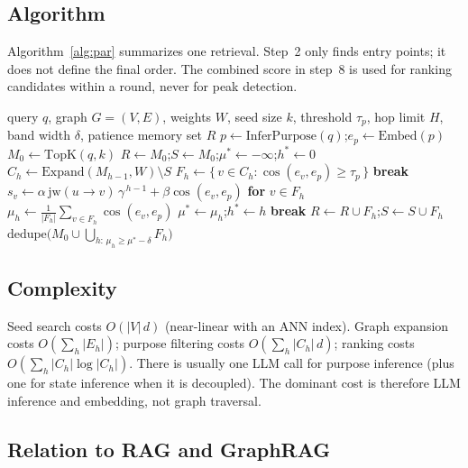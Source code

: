 \documentclass[11pt]{article}
\begin{document}
\subsection{Algorithm}

Algorithm~\ref{alg:par} summarizes one retrieval. Step~2 only finds entry points; it does not
define the final order. The combined score in step~8 is used for ranking candidates within a
round, never for peak detection.

\begin{algorithm}[t]
  \caption{PAR}\label{alg:par}
  \begin{algorithmic}[1]
    \Require query $q$, graph $G=(V,E)$, weights $W$, seed size $k$, threshold $\tau_p$,
             hop limit $H$, band width $\delta$, patience
    \Ensure memory set $R$
    \State $p\gets\mathrm{InferPurpose}(q)$;\quad $e_p\gets\mathrm{Embed}(p)$
    \State $M_0\gets\mathrm{TopK}(q,k)$ 
    \State $R\gets M_0$;\quad $S\gets M_0$;\quad $\mu^\ast\gets-\infty$;\quad $h^\ast\gets0$
      \State $C_h\gets\mathrm{Expand}(M_{h-1},W)\setminus S$
      \State $F_h\gets\{\,v\in C_h:\cos(e_v,e_p)\ge\tau_p\,\}$
       \State \textbf{break} \EndIf
      \State $s_v\gets\alpha\,\mathrm{jw}(u\!\to\!v)\,\gamma^{\,h-1}
             +\beta\cos(e_v,e_p)$ \textbf{for} $v\in F_h$
      \State $\mu_h\gets\frac{1}{|F_h|}\sum_{v\in F_h}\cos(e_v,e_p)$
       \State $\mu^\ast\gets\mu_h$;\quad $h^\ast\gets h$ \EndIf
       \State \textbf{break} \EndIf
      \State $R\gets R\cup F_h$;\quad $S\gets S\cup F_h$
    \EndFor
    \State \Return $\mathrm{dedupe}\bigl(M_0\cup\bigcup_{h:\,\mu_h\ge\mu^\ast-\delta}F_h\bigr)$
  \end{algorithmic}
\end{algorithm}

\subsection{Complexity}

Seed search costs $O(|V|\,d)$ (near-linear with an ANN index). Graph expansion costs
$O(\sum_h|E_h|)$; purpose filtering costs $O(\sum_h|C_h|\,d)$; ranking costs
$O(\sum_h|C_h|\log|C_h|)$. There is usually one LLM call for purpose inference (plus one for
state inference when it is decoupled). The dominant cost is therefore LLM inference and
embedding, not graph traversal.

\subsection{Relation to RAG and GraphRAG}
\end{document}
